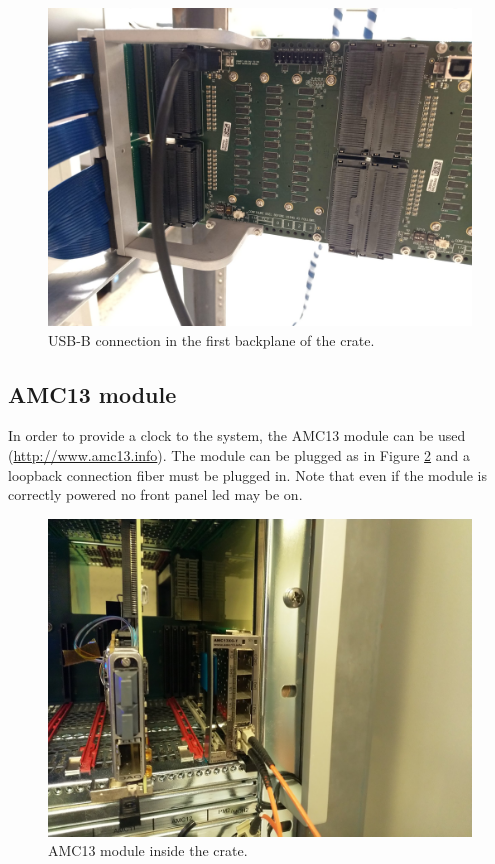 \documentclass[10pt,a4paper]{article}
\begin{document}
\begin{figure}[h!]
\centering
 \includegraphics[width=0.8\linewidth]{USBBCrate.jpeg} 
  \caption{USB-B connection in the first backplane of the crate.}
  \label{USBBCrate}
\end{figure}

\subsection{AMC13 module}
In order to provide a clock to the system, the AMC13 module can be used (\url{http://www.amc13.info}). The module can be plugged as in Figure \ref{amc13} and a loopback connection fiber must be plugged in. Note that even if the module is correctly powered no front panel led may be on.
\begin{figure}[h!]
\centering
 \includegraphics[width=0.8\linewidth]{amc13.jpg} 
  \caption{AMC13 module inside the crate.}
  \label{amc13}
\end{figure}
\end{document}
